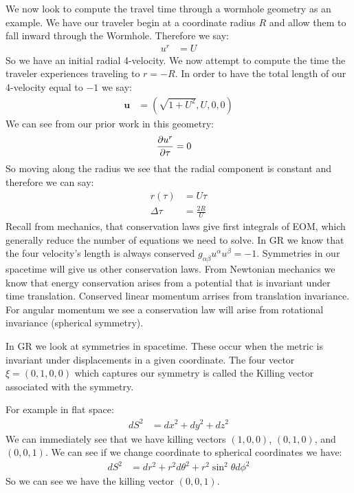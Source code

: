 We now look to compute the travel time through a wormhole geometry as an example. We have our traveler begin at a coordinate radius $R$ and allow them to fall inward through the Wormhole.
Therefore we say:
\begin{align*}
	u^r &= U
\end{align*}
So we have an initial radial 4-velocity. We now attempt to compute the time the traveler experiences traveling to $r=-R$. In order to have the total length of our 4-velocity equal to $-1$ we say:
\begin{align*}
	\bm{u} &= (\sqrt{1+ U^2},U,0,0)
\end{align*}
We can see from our prior work in this geometry:
\begin{align*}
	\frac{\partial u^r}{\partial \tau} &= 0
\end{align*}
So moving along the radius we see that the radial component is constant and therefore we can say:
\begin{align*}
	r(\tau) &= U\tau \\
	\Delta\tau &= \frac{2R}{U}
\end{align*}
Recall from mechanics, that conservation laws give first integrals of EOM, which generally reduce the number of equations we need to solve.
In GR we know that the four velocity's length is always conserved $g_{\alpha\beta} u^\alpha u^\beta = -1$.
Symmetries in our spacetime will give us other conservation laws. From Newtonian mechanics we know that energy conservation arises from a potential that is invariant under time translation.
Conserved linear momentum arrises from translation invariance. For angular momentum we see a conservation law will arise from rotational invariance (spherical symmetry).

In GR we look at symmetries in spacetime. These occur when the metric is invariant under displacements in a given coordinate.
The four vector $\xi = (0,1,0,0)$ which captures our symmetry is called the Killing vector associated with the symmetry.

For example in flat space:
\begin{align*}
	dS^2 &= dx^2 + dy^2 + dz^2
\end{align*}
We can immediately see that we have killing vectors $(1,0,0)$, $(0,1,0)$, and $(0,0,1)$. We can see if we change coordinate to spherical coordinates we have:
\begin{align*}
	dS^2 &= dr^2 + r^2 d\theta^2 + r^2\sin^2\theta d\phi^2
\end{align*}
So we can see we have the killing vector $(0,0,1)$.

